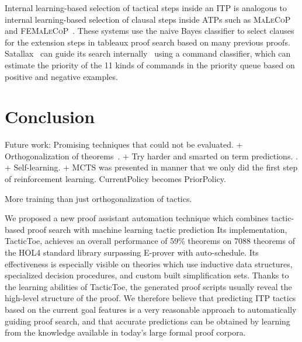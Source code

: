 \documentclass[runningheads,a4paper,draft]{svjour3}
\def\holfour{\textsf{HOL4}\xspace}
\def\hollight{\textsf{HOL Light}\xspace}
\def\eprover{\textsf{E-prover}\xspace}
\def\tactictoe{\textsf{TacticToe}\xspace}
\begin{document}
Internal learning-based selection of tactical steps inside an ITP is analogous 
to internal learning-based selection of clausal steps inside ATPs such as 
\textsc{MaLeCoP}~\cite{malecop} and \textsc{FEMaLeCoP}~\cite{femalecop}. These 
systems
use the naive Bayes classifier to  select clauses for the extension steps in
tableaux proof search based on many previous proofs. Satallax~\cite{Brown2012a} 
can guide its
search internally~\cite{mllax} using a command classifier, which can estimate 
the priority of the 11 kinds of
commands in the priority queue based on positive and negative examples.




\section{Conclusion}\label{sec:concl}

Future work:
  Promising techniques that could not be evaluated. 
  + Orthogonalization of theorems~\cite{ckju-jsc15}. 
  + Try harder and smarted on term predictions. \cite{latest-version-of-sepia}. 
  \cite{conjecturing}
  + Self-learning.  
+ MCTS was presented in manner that we only did the first step of reinforcement 
learning. CurrentPolicy becomes PriorPolicy.
 
More training than just orthogonalization of tactics.


We proposed a new proof assistant automation technique which combines 
tactic-based proof search with machine learning tactic prediction
Its implementation,
\tactictoe, achieves an overall performance of 59\% theorems on 7088 theorems  
of the \holfour standard library surpassing \eprover with 
auto-schedule. Its 
effectiveness is especially visible on 
theories which use inductive data structures, specialized decision procedures, 
and custom built simplification sets.
Thanks to the learning abilities of \tactictoe, the generated proof scripts 
usually reveal the high-level structure of the proof. %
We therefore believe that predicting ITP tactics based on the current goal 
features is a very reasonable approach to automatically guiding proof search, 
and that accurate predictions can be obtained by learning from the knowledge 
available in today's large formal proof corpora. 
\end{document}
